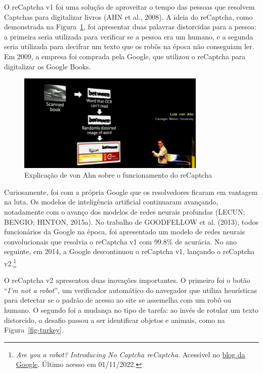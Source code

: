 \documentclass[12pt,twoside,brazilian]{book}
\begin{document}
O reCaptcha v1 foi uma solução de aproveitar o tempo das pessoas que
resolvem Captchas para digitalizar livros (AHN et al., 2008). A ideia do
reCaptcha, como demonstrada na Figura~\ref{fig-recaptcha-v1}, foi
apresentar duas palavras distorcidas para a pessoa: a primeira seria
utilizada para verificar se a pessoa era um humano, e a segunda seria
utilizada para decifrar um texto que os robôs na época não conseguiam
ler. Em 2009, a empresa foi comprada pela Google, que utilizou o
reCaptcha para digitalizar os Google Books.

\begin{figure}

{\centering \includegraphics[width=0.8\textwidth,height=\textheight]{./assets/img/recaptcha-v1.png}

}

\caption{\label{fig-recaptcha-v1}Explicação de von Ahn sobre o
funcionamento do reCaptcha}

\end{figure}

Curiosamente, foi com a própria Google que os resolvedores ficaram em
vantagem na luta. Os modelos de inteligência artificial continuaram
avançando, notadamente com o avanço dos modelos de redes neurais
profundas (LECUN; BENGIO; HINTON, 2015a). No trabalho de GOODFELLOW et
al. (2013), todos funcionários da Google na época, foi apresentado um
modelo de redes neurais convolucionais que resolvia o reCaptcha v1 com
99.8\% de acurácia. No ano seguinte, em 2014, a Google descontinuou o
reCaptcha v1, lançando o reCaptcha v2.\footnote{\emph{Are you a robot?
  Introducing No Captcha reCaptcha.} Acessível no
  \href{https://security.googleblog.com/2014/12/are-you-robot-introducing-no-captcha.html}{blog
  da Google}. Último acesso em 01/11/2022.}

O reCaptcha v2 apresentou duas inovações importantes. O primeiro foi o
botão ``\emph{I'm not a robot}'', um verificador automático do navegador
que utiliza heurísticas para detectar se o padrão de acesso ao site se
assemelha com um robô ou humano. O segundo foi a mudança no tipo de
tarefa: ao invés de rotular um texto distorcido, o desafio passou a ser
identificar objetos e animais, como na Figura~\ref{fig-turkey}.
\end{document}
